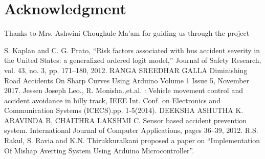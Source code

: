 \documentclass[conference]{IEEEtran}
\begin{document}
    \section*{Acknowledgment}

    Thanks to Mrs. Ashwini Choughule Ma'am for guiding us through the project


    \begin{thebibliography}{00}
         S. Kaplan and C. G. Prato, “Risk factors associated with bus accident severity in the United States: a generalized ordered logit model,” Journal of Safety
        Research, vol. 43, no. 3, pp. 171–180, 2012.
         RANGA SREEDHAR GALLA Diminishing Road Accidents On Sharp Curves Using Arduino Volume 1 Issue 5, November 2017.
         Jessen Joseph Leo., R. Monisha.,et.al. : Vehicle movement control and accident avoidance in hilly track, IEEE Int. Conf. on Electronics and Communication
        Systems (ICECS).pp. 1-5(2014).
         DEEKSHA ASHUTHA K. ARAVINDA B, CHAITHRA LAKSHMI C. Sensor based accident prevention system. International Journal of Computer
        Applications, pages 36–39, 2012.
         R.S. Rakul, S. Ravia and K.N. Thirukkuralkani proposed a paper on “Implementation Of
        Mishap Averting System Using Arduino Microcontroller”.
        \end{thebibliography}
\end{document}
